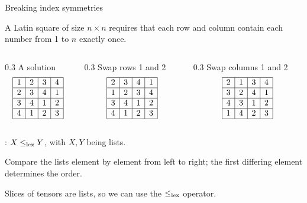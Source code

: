 \documentclass{cons-beamer}
\begin{document}
\begin{frame}{Breaking index symmetries}
  \begin{example}
    \footnotesize
    A Latin square of size $n \times n$ requires that each row and column contain each number from 1 to $n$ exactly once.
    \vfill

    \begin{columns}
      \begin{column}{0.3\textwidth}
        \centering A solution
        \[
          \begin{array}{|c|c|c|c|}
            \hline
            1 & 2 & 3 & 4 \\
            \hline
            2 & 3 & 4 & 1 \\
            \hline
            3 & 4 & 1 & 2 \\
            \hline
            4 & 1 & 2 & 3 \\
            \hline
          \end{array}
        \]
      \end{column}
      \begin{column}{0.3\textwidth}
        \pause
        \centering Swap rows 1 and 2
        \[
          \begin{array}{|c|c|c|c|}
            \hline
            2 & 3 & 4 & 1 \\
            \hline
            1 & 2 & 3 & 4 \\
            \hline
            3 & 4 & 1 & 2 \\
            \hline
            4 & 1 & 2 & 3 \\
            \hline
          \end{array}
        \]
      \end{column}
      \begin{column}{0.3\textwidth}
        \centering Swap columns 1 and 2
        \[
          \begin{array}{|c|c|c|c|}
            \hline
            2 & 1 & 3 & 4 \\
            \hline
            3 & 2 & 4 & 1 \\
            \hline
            4 & 3 & 1 & 2 \\
            \hline
            1 & 4 & 2 & 3 \\
            \hline
          \end{array}
        \]
      \end{column}
    \end{columns}
  \end{example}
  \vfill

  \pause

  : $X \leq_{\textnormal{lex}} Y$, with $X,Y$ being lists.
  \vfill

  Compare the lists element by element from left to right; the first differing element determines the order.
  \vfill

  Slices of tensors are lists, so we can use the $\leq_{\textnormal{lex}}$ operator.
\end{frame}
\end{document}
